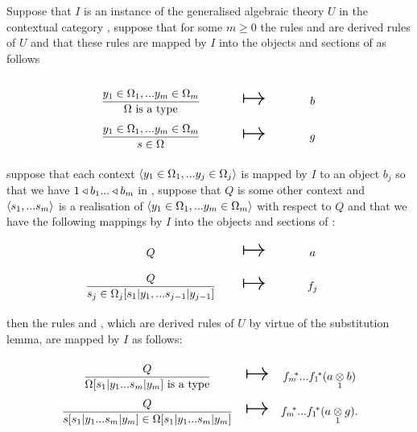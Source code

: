 \newpage
{ %
\newcommand {\forceSOURCEwidth}{\rule{5cm}{0pt}}  %
\newcommand {\forceTARGETwidth}{\rule{2.2cm}{0pt}}
\begin{lemma}

\newcommand{\sjrule}   {\gatdisplayrule{Q}         {\ofT{s_j}{\Omega_j[s_1|y_1,...s_{j-1}|y_{j-1}]}}}
\newcommand{\omegarule}{\gatdisplayrule{\yOmega{m}}{\isT{\Omega}}}
\newcommand{\srule}    {\gatdisplayrule{\yOmega{m}}{\ofT{s}{\Omega}}}
\newcommand{\omegarulesubstituted}{\gatdisplayrule{Q}{\isT{\Omega[s_1|y_1...s_m|y_m]}} }
\newcommand{\srulesubstituted}{\gatdisplayrule{Q}{\ofT{s[s_1|y_1...s_m|y_m]}{\Omega[s_1|y_1...s_m|y_m]}} }

Suppose that $I$ is an instance of the generalised algebraic theory $U$ in the contextual category \catc,
suppose that for some $m \geq 0$ the rules  \omegarule  and \srule are derived rules of $U$
and that these rules are mapped by $I$ into the objects and sections of \catcw as follows


\begin{equation*}
\begin{array}{c c c}
\forceSOURCEwidth & & \forceTARGETwidth \\ [-0.1cm]
\omegarule & \Imapsto & b   \\ [0.4cm]
\srule     & \Imapsto & g
\end{array}
\end{equation*}
suppose that each context $\langle y_1 \in \Omega_1,... y_{j} \in \Omega_{j}\rangle$  is mapped by $I$ to an object $b_j$ so that we have 
$1 \triangleleft b_1 ... \triangleleft b_m$ in \catc,
suppose  that $Q$ is some other context and $\langle s_1,...s_m\rangle$ is a realisation of $\langle y_1 \in \Omega_1,... y_{m} \in \Omega_{m}\rangle$ with respect to $Q$
and that we have the following mappings by $I$ into the objects and sections of \catc:
\begin{equation*}
\begin{array}{c c c}
\forceSOURCEwidth & & \forceTARGETwidth \\ [-0.1cm]
Q          & \Imapsto & a   \\ [0.4cm]
\sjrule    & \Imapsto & f_j \\ [0.4cm]
\end{array}
\end{equation*}
then the rules \omegarulesubstituted and  \srulesubstituted, which are derived rules of $U$ by virtue of the substitution lemma, are mapped by $I$ as follows:
\begin{equation*}
\begin{array}{c c c}
\forceSOURCEwidth & & \forceTARGETwidth \\ [-0.1cm]
\omegarulesubstituted  & \Imapsto & \fmstar...\fonestar (\crossx{a}{b}{1})   \\ [0.4cm]
\srulesubstituted      & \Imapsto & \fmstar...\fonestar (\crossx{a}{g}{1}).
\end{array}
\end{equation*}


\end{lemma}}
